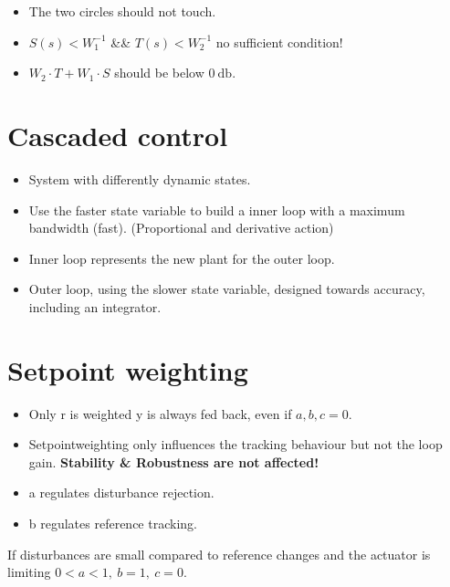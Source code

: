 \documentclass[10pt,a4paper]{scrartcl}
\begin{document}
\begin{multicols*}{3}
	

	\begin{itemize}
	\compaq
	\item
	The two circles should not touch.
	\item
	$S(s)<W_1^{-1}$ \&\& $T(s)<W_2^{-1}$ no sufficient condition!
	\item
	$W_2\cdot T+W_1\cdot S$ should be below $\SI{0}{\decibel}$.
	\end{itemize}

	\section{Cascaded control}
	
	
	\begin{itemize}
	\compaq
	\item
	System with differently dynamic states.
	\item
	Use the faster state variable to build a inner loop with a maximum bandwidth (fast). (Proportional and derivative action)
	\item
	Inner loop represents the new plant for the outer loop.
	\item
	Outer loop, using the slower state variable, designed towards accuracy, including an integrator. 
	\end{itemize}
	
	\section{Setpoint weighting}
	
	
	\begin{itemize}
	\compaq
	\item Only r is weighted \dahe y is always fed back, even if $a,b,c = 0$.
	\item Setpointweighting only influences the tracking behaviour but not the loop gain. \textbf{Stability \& Robustness are not affected!}
	\item a regulates disturbance rejection.
	\item b regulates reference tracking. 
	\end{itemize}
	
	If disturbances are small compared to reference changes and the actuator is limiting \dahe $0<a<1,\ b=1,\ c=0$.
	

\end{multicols*}
\end{document}

